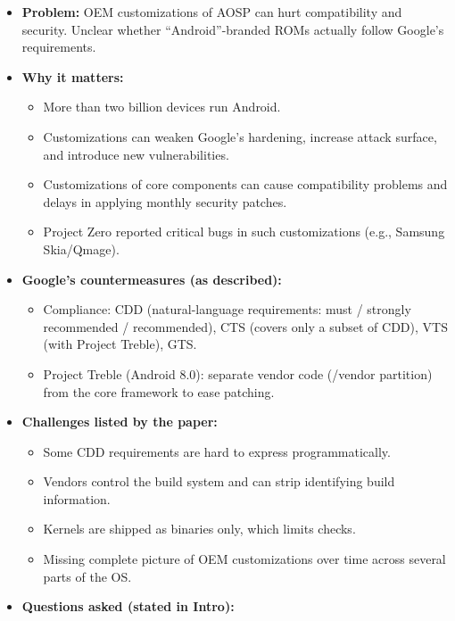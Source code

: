 \documentclass[11pt,a4paper]{article}
\begin{document}
\begin{enumerate}
    \begin{itemize}[leftmargin=*,itemsep=1pt,topsep=2pt]
        \item \textbf{Problem:} OEM customizations of AOSP can hurt compatibility and security. Unclear whether ``Android''-branded ROMs actually follow Google's requirements.
        \item \textbf{Why it matters:}
        \begin{itemize}[itemsep=0pt]
            \item More than two billion devices run Android.
            \item Customizations can weaken Google's hardening, increase attack surface, and introduce new vulnerabilities.
            \item Customizations of core components can cause compatibility problems and delays in applying monthly security patches.
            \item Project Zero reported critical bugs in such customizations (e.g., Samsung Skia/Qmage).
        \end{itemize}
        \item \textbf{Google's countermeasures (as described):}
        \begin{itemize}[itemsep=0pt]
            \item Compliance: CDD (natural-language requirements: must / strongly recommended / recommended), CTS (covers only a subset of CDD), VTS (with Project Treble), GTS.
            \item Project Treble (Android 8.0): separate vendor code (/vendor partition) from the core framework to ease patching.
        \end{itemize}
        \item \textbf{Challenges listed by the paper:}
        \begin{itemize}[itemsep=0pt]
            \item Some CDD requirements are hard to express programmatically.
            \item Vendors control the build system and can strip identifying build information.
            \item Kernels are shipped as binaries only, which limits checks.
            \item Missing complete picture of OEM customizations over time across several parts of the OS.
        \end{itemize}
        \item \textbf{Questions asked (stated in Intro):}
        \begin{itemize}[itemsep=0pt]

\end{itemize}
\end{itemize}
\end{enumerate}
\end{document}
